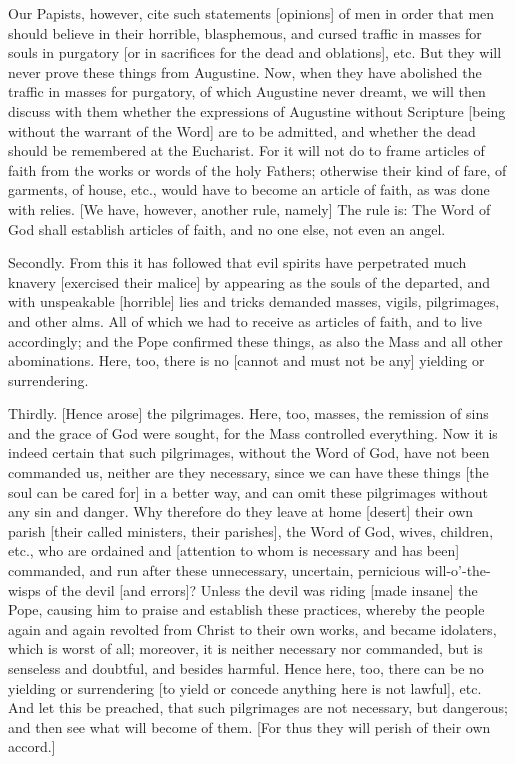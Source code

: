 Our Papists, however, cite such statements [opinions] of men
in order that men should believe in their horrible,
blasphemous, and cursed traffic in masses for souls in
purgatory [or in sacrifices for the dead and oblations], etc.
But they will never prove these things from Augustine. Now,
when they have abolished the traffic in masses for purgatory,
of which Augustine never dreamt, we will then discuss with
them whether the expressions of Augustine without Scripture
[being without the warrant of the Word] are to be admitted,
and whether the dead should be remembered at the Eucharist.
For it will not do to frame articles of faith from the works
or words of the holy Fathers; otherwise their kind of fare, of
garments, of house, etc., would have to become an article of
faith, as was done with relies. [We have, however, another
rule, namely] The rule is: The Word of God shall establish
articles of faith, and no one else, not even an angel.

Secondly. From this it has followed that evil spirits have
perpetrated much knavery [exercised their malice] by appearing
as the souls of the departed, and with unspeakable [horrible]
lies and tricks demanded masses, vigils, pilgrimages, and
other alms. All of which we had to receive as articles of
faith, and to live accordingly; and the Pope confirmed these
things, as also the Mass and all other abominations. Here,
too, there is no [cannot and must not be any] yielding or
surrendering.

Thirdly. [Hence arose] the pilgrimages. Here, too, masses, the
remission of sins and the grace of God were sought, for the
Mass controlled everything. Now it is indeed certain that such
pilgrimages, without the Word of God, have not been commanded
us, neither are they necessary, since we can have these things
[the soul can be cared for] in a better way, and can omit
these pilgrimages without any sin and danger. Why therefore do
they leave at home [desert] their own parish [their called
ministers, their parishes], the Word of God, wives, children,
etc., who are ordained and [attention to whom is necessary and
has been] commanded, and run after these unnecessary,
uncertain, pernicious will-o'-the-wisps of the devil [and
errors]? Unless the devil was riding [made insane] the Pope,
causing him to praise and establish these practices, whereby
the people again and again revolted from Christ to their own
works, and became idolaters, which is worst of all; moreover,
it is neither necessary nor commanded, but is senseless and
doubtful, and besides harmful. Hence here, too, there can be
no yielding or surrendering [to yield or concede anything here
is not lawful], etc. And let this be preached, that such
pilgrimages are not necessary, but dangerous; and then see
what will become of them. [For thus they will perish of their
own accord.]

